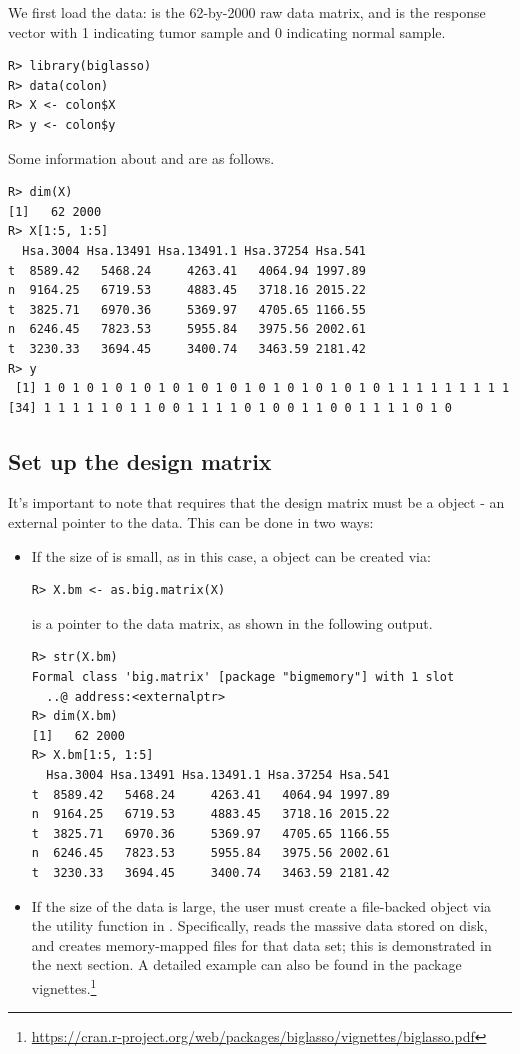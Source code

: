 We first load the data:  is the 62-by-2000 raw data matrix, and  is the response vector with 1 indicating tumor sample and 0 indicating normal sample.

\begin{verbatim}
R> library(biglasso)
R> data(colon)
R> X <- colon$X
R> y <- colon$y
\end{verbatim}

Some information about  and  are as follows.
\begin{verbatim}
R> dim(X)
[1]   62 2000
R> X[1:5, 1:5]
  Hsa.3004 Hsa.13491 Hsa.13491.1 Hsa.37254 Hsa.541
t  8589.42   5468.24     4263.41   4064.94 1997.89
n  9164.25   6719.53     4883.45   3718.16 2015.22
t  3825.71   6970.36     5369.97   4705.65 1166.55
n  6246.45   7823.53     5955.84   3975.56 2002.61
t  3230.33   3694.45     3400.74   3463.59 2181.42
R> y
 [1] 1 0 1 0 1 0 1 0 1 0 1 0 1 0 1 0 1 0 1 0 1 0 1 0 1 1 1 1 1 1 1 1 1
[34] 1 1 1 1 1 0 1 1 0 0 1 1 1 1 0 1 0 0 1 1 0 0 1 1 1 1 0 1 0
\end{verbatim}

\subsection{Set up the design matrix}

It's important to note that  requires that the design matrix  must be a  object - an external pointer to the data. This can be done in two ways:
\begin{itemize}
\item If the size of  is small, as in this case, a  object can be created via:
\begin{verbatim}
R> X.bm <- as.big.matrix(X)
\end{verbatim}
 is a pointer to the data matrix, as shown in the following output.
\begin{verbatim}
R> str(X.bm)
Formal class 'big.matrix' [package "bigmemory"] with 1 slot
  ..@ address:<externalptr> 
R> dim(X.bm)
[1]   62 2000
R> X.bm[1:5, 1:5]
  Hsa.3004 Hsa.13491 Hsa.13491.1 Hsa.37254 Hsa.541
t  8589.42   5468.24     4263.41   4064.94 1997.89
n  9164.25   6719.53     4883.45   3718.16 2015.22
t  3825.71   6970.36     5369.97   4705.65 1166.55
n  6246.45   7823.53     5955.84   3975.56 2002.61
t  3230.33   3694.45     3400.74   3463.59 2181.42
\end{verbatim}

\item If the size of the data is large, the user must create a file-backed  object via the utility function  in . Specifically,  reads the massive data stored on disk, and creates memory-mapped files for that data set; this is demonstrated in the next section. A detailed example can also be found in the package vignettes.\footnote{\url{https://cran.r-project.org/web/packages/biglasso/vignettes/biglasso.pdf}}

\end{itemize}

